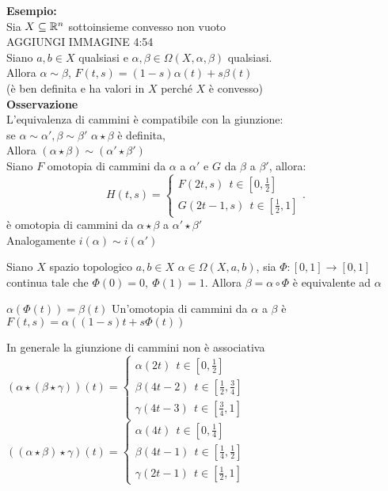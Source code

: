 \documentclass[12px]{article}
\begin{document}
\textbf{Esempio:}\\
Sia $X\subseteq \mathbb{R}^n$ sottoinsieme convesso non vuoto\\
AGGIUNGI IMMAGINE 4:54\\
Siano $a,b\in X$ qualsiasi e $\alpha,\beta\in \Omega(X,\alpha,\beta)$ qualsiasi.\\
Allora $\alpha\sim \beta$,  $F(t,s) = (1-s)\alpha(t) + s\beta(t)$ \\
(è ben definita e ha valori in $X$ perché $X $ è convesso)\\
\textbf{Osservazione}\\
L'equivalenza di cammini è compatibile con la giunzione:\\
se $\alpha\sim\alpha', \beta\sim\beta'$  $\alpha\star\beta$ è definita,\\
Allora $(\alpha\star\beta)\sim(\alpha'\star\beta')$\\
Siano  $F$ omotopia di cammini da $\alpha$ a $\alpha'$ e  $G$ da $ \beta$ a $\beta'$, allora:  \[H(t,s) = \begin{cases}
	F(2t,s) \ \ t\in[0,\frac 12]\\
	G(2t - 1, s) \ \ t\in[\frac 12, 1]
\end{cases}.\]
è omotopia di cammini da $\alpha\star\beta$ a $\alpha'\star\beta'$\\
Analogamente  $i(\alpha)\sim i(\alpha')$ 
\begin{lemm}
	Siano $X$ spazio topologico $a,b\in X$  $\alpha\in \Omega(X,a,b)$, sia  $\Phi: [0,1] \rightarrow [0,1]$ continua tale che $\Phi(0) = 0, \ \Phi(1) = 1$. Allora $\beta = \alpha\circ \Phi$ è equivalente ad  $\alpha$
\end{lemm}
\begin{dimo}
	$\alpha(\Phi(t)) = \beta(t)$ Un'omotopia di cammini da  $\alpha$ a $\beta $ è $F(t,s) = \alpha((1-s)t + s\Phi(t))$
\end{dimo}
In generale la giunzione di cammini non è associativa\\
$(\alpha\star(\beta\star\gamma))(t)= \begin{cases}
	\alpha(2t)\ \ t\in[0,\frac 12]\\
	\beta (4t-2)\ \ t\in [\frac 12, \frac 34]\\
	\gamma(4t - 3)\ \ t\in[\frac 34, 1]
\end{cases}$ \\
$((\alpha\star\beta)\star\gamma)(t)= \begin{cases}
	\alpha(4t) \ \ t\in[0,\frac 14]\\
	\beta(4t - 1) \ \ t\in[\frac 14,\frac 12]\\
	\gamma(2t - 1) \ \ t\in[\frac 12, 1]
\end{cases}$
\end{document}
